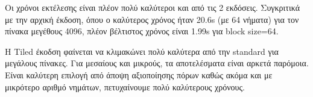 \documentclass[letterpaper,12pt]{article}
\begin{document}
Οι χρόνοι εκτέλεσης είναι πλέον πολύ καλύτεροι και από τις 2 εκδόσεις. Συγκριτικά με την αρχική έκδοση,
όπου ο καλύτερος χρόνος ήταν 20.6s (με 64 νήματα) για τον πίνακα μεγέθους 4096, πλέον βέλτιστος χρόνος
είναι 1.99s για block size=64. 

Η Tiled έκοδση φαίνεται να κλιμακώνει πολύ καλύτερα από την standard για μεγάλους πίνακες. Για μεσαίους
και μικρούς, τα αποτελέσματα είναι αρκετά παρόμοια. Είναι καλύτερη επιλογή από άποψη αξιοποίησης πόρων
καθώς ακόμα και με μικρότερο αριθμό νημάτων, πετυχαίνουμε πολύ καλύτερους χρόνους.
\end{document}
